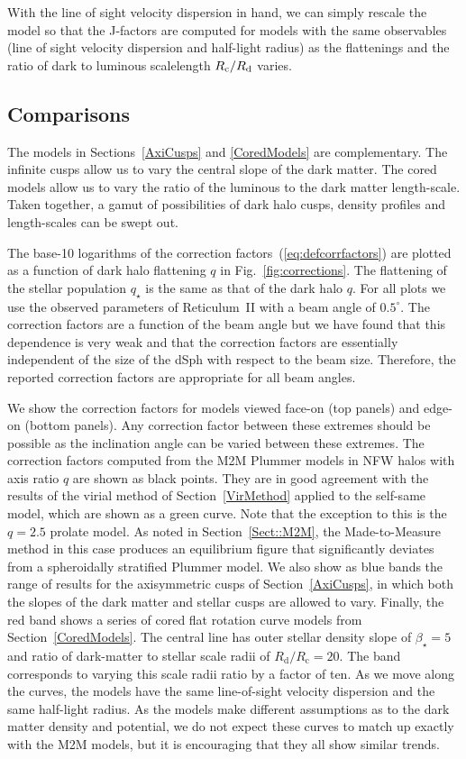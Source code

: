 \documentclass[prd,twocolumn,showpacs,preprintnumbers,superscriptaddress,nofootinbib,amsmath,amssymb,nobalancelastpage]{revtex4}
\def\Rd{{R_{\rm d}}}
\def\Rc{{R_{\rm c}}}
\begin{document}
With the line of sight velocity dispersion in hand, we can simply
rescale the model so that the J-factors are computed for models with
the same observables (line of sight velocity dispersion and half-light
radius) as the flattenings and the ratio of dark to luminous
scalelength $\Rc/\Rd$ varies.

\subsection{Comparisons}

The models in Sections~\ref{AxiCusps} and \ref{CoredModels} are
complementary. The infinite cusps allow us to vary the central slope of
the dark matter. The cored models allow us to vary the ratio of the
luminous to the dark matter length-scale. Taken together, a gamut of
possibilities of dark halo cusps, density profiles and length-scales
can be swept out.

The base-10 logarithms of the correction factors~(\ref{eq:defcorrfactors}) are plotted as a
function of dark halo flattening $q$ in
Fig.~\ref{fig:corrections}. The flattening of the stellar population
$q_\star$ is the same as that of the dark halo $q$. For all plots we use the observed parameters of Reticulum~II with a beam angle of $0.5^\circ$. The correction factors are a function of the beam angle but we have found that this dependence is very weak and that the correction factors are essentially independent of the size of the dSph with respect to the beam size. Therefore, the reported correction factors are appropriate for all beam angles.

We show the
correction factors for models viewed face-on (top panels) and edge-on
(bottom panels). Any correction factor between these extremes should
be possible as the inclination angle can be varied between these
extremes. The correction factors computed from the M2M Plummer models
in NFW halos with axis ratio $q$ are shown as black points. They are
in good agreement with the results of the virial method of
Section~\ref{VirMethod} applied to the self-same model, which are
shown as a green curve. Note that the exception to this is the $q=2.5$ prolate model. As noted in Section~\ref{Sect::M2M}, the Made-to-Measure method in this case produces an equilibrium figure that significantly deviates from a spheroidally stratified Plummer model. We also show as blue bands the range of
results for the axisymmetric cusps of Section~\ref{AxiCusps}, in which
both the slopes of the dark matter and stellar cusps are allowed to
vary. Finally, the red band shows a series of cored flat rotation
curve models from Section~\ref{CoredModels}. The central line has
outer stellar density slope of $\beta_\star=5$ and ratio of
dark-matter to stellar scale radii of
$R_\mathrm{d}/R_\mathrm{c}=20$. The band corresponds to varying this
scale radii ratio by a factor of ten. As we move along the curves, the
models have the same line-of-sight velocity dispersion and the same
half-light radius.  As the models make different assumptions as to the
dark matter density and potential, we do not expect these curves to
match up exactly with the M2M models, but it is encouraging that they
all show similar trends.
\end{document}
